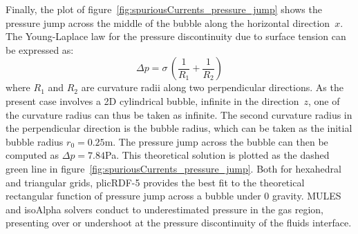 \documentclass[review]{elsarticle}
\begin{document}
Finally, the plot of figure~\ref{fig:spuriousCurrents_pressure_jump} shows the pressure jump across the middle of the bubble along the horizontal direction~$x$. The Young-Laplace law for the pressure discontinuity due to surface tension can be expressed as:
\begin{equation}
  \Delta p = \sigma \, \left( \frac{1}{R_1} + \frac{1}{R_2} \right)
  \label{eqnYoungLaplace}
\end{equation}
where $R_1$ and $R_2$ are curvature radii along two perpendicular directions. As the present case involves a 2D cylindrical bubble, infinite in the direction~$z$, one of the curvature radius can thus be taken as infinite. The second curvature radius in the perpendicular direction is the bubble radius, which can be taken as the initial bubble radius $r_0=0.25$m. The pressure jump across the bubble can then be computed as $\Delta p=7.84$Pa. This theoretical solution is plotted as the dashed green line in figure~\ref{fig:spuriousCurrents_pressure_jump}. Both for hexahedral and triangular grids, plicRDF-5 provides the best fit to the theoretical rectangular function of pressure jump across a bubble under 0 gravity. MULES and isoAlpha solvers conduct to underestimated pressure in the gas region, presenting over or undershoot at the pressure discontinuity of the fluids interface.
\end{document}
